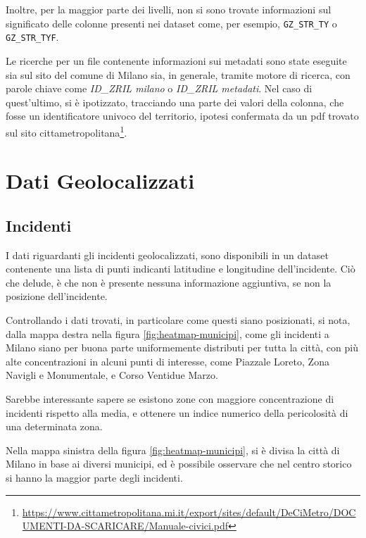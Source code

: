 \documentclass[a4paper,12pt]{report}
\newcommand{\columnstyle}[1]{\texttt{#1}}
\newcommand{\quotestyle}[1]{\textit{#1}}
\begin{document}
Inoltre, per la maggior parte dei livelli, non si sono trovate informazioni sul significato 
delle colonne presenti nei dataset come, per esempio, \columnstyle{GZ\_STR\_TY} o 
\columnstyle{GZ\_STR\_TYF}. 

Le ricerche per un file contenente informazioni sui metadati sono state eseguite sia 
sul sito del comune di Milano sia, in generale, tramite motore di ricerca, con parole chiave 
come \quotestyle{ID\_ZRIL milano} o \quotestyle{ID\_ZRIL metadati}. 
Nel caso di quest'ultimo, si è ipotizzato, tracciando una parte dei valori della colonna, 
che fosse un identificatore univoco del territorio, ipotesi confermata da un pdf trovato sul sito 
cittametropolitana\footnote{\url{https://www.cittametropolitana.mi.it/export/sites/default/DeCiMetro/DOCUMENTI-DA-SCARICARE/Manuale-civici.pdf}}. 

\chapter{Dati Geolocalizzati}

\section{Incidenti}

I dati riguardanti gli incidenti geolocalizzati, sono disponibili in un dataset contenente una 
lista di punti indicanti latitudine e longitudine dell'incidente. 
Ciò che delude, è che non è presente nessuna informazione aggiuntiva, se non la posizione 
dell'incidente.

Controllando i dati trovati, in particolare come questi siano posizionati, 
si nota, dalla mappa destra nella figura \ref{fig:heatmap-municipi}, come gli incidenti a Milano 
siano per buona parte uniformemente distributi per tutta la città, 
con più alte concentrazioni in alcuni punti di interesse, come Piazzale Loreto, Zona Navigli 
e Monumentale, e Corso Ventidue Marzo.

Sarebbe interessante sapere se esistono zone con maggiore concentrazione di incidenti rispetto 
alla media, e ottenere un indice numerico della pericolosità di una determinata zona.

Nella mappa sinistra della figura \ref{fig:heatmap-municipi}, si è divisa la città di Milano 
in base ai diversi municipi, ed è possibile osservare che nel centro storico si hanno la 
maggior parte degli incidenti.
\end{document}
